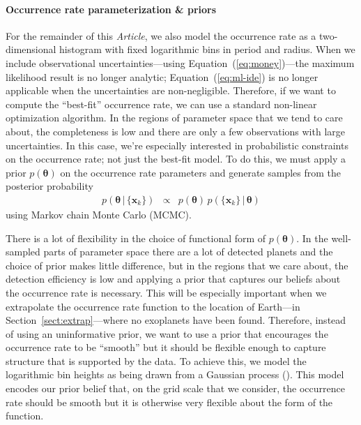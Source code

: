 \documentclass[12pt,preprint]{aastex}
\newcommand{\paper}{\textsl{Article}}
\newcommand{\Eq}[1]{Equation~(\ref{eq:#1})}
\newcommand{\eq}[1]{\Eq{#1}}
\newcommand{\eqlabel}[1]{\label{eq:#1}}
\newcommand{\Sect}[1]{Section~\ref{sect:#1}}
\newcommand{\sect}[1]{\Sect{#1}}
\newcommand{\bvec}[1]{\ensuremath{\boldsymbol{#1}}}
\newcommand{\ratepar}{{\ensuremath{\theta}}}
\newcommand{\ratepars}{{\ensuremath{\bvec{\ratepar}}}}
\newcommand{\data}{{\ensuremath{\bvec{x}}}}
\begin{document}
\paragraph{Occurrence rate parameterization \& priors}
For the remainder of this \paper, we also model the occurrence rate as a
two-dimensional histogram with fixed logarithmic bins in period and radius.
When we include observational uncertainties---using \eq{money}---the maximum
likelihood result is no longer analytic; \eq{ml-ide} is no longer applicable
when the uncertainties are non-negligible.
Therefore, if we want to compute the ``best-fit'' occurrence rate, we can use a
standard non-linear optimization algorithm.
In the regions of parameter space that we tend to care about, the completeness
is low and there are only a few observations with large uncertainties.
In this case, we're especially interested in probabilistic constraints on the
occurrence rate; not just the best-fit model.
To do this, we must apply a prior $p(\ratepars)$ on the occurrence rate
parameters and generate samples from the posterior probability
\begin{eqnarray}\eqlabel{posterior}
p(\ratepars\,|\,\{\data_k\}) &\propto&
    p(\ratepars)\,p(\{\data_k\}\,|\,\ratepars)
\end{eqnarray}
using Markov chain Monte Carlo (MCMC).

There is a lot of flexibility in the choice of functional form of
$p(\ratepars)$.
In the well-sampled parts of parameter space there are a lot of
detected planets and the choice of prior makes little difference, but in the
regions that we care about, the detection efficiency is low and applying a
prior that captures our beliefs about the occurrence rate is necessary.
This will be especially important when we extrapolate the occurrence rate
function to the location of Earth---in \sect{extrap}---where no exoplanets
have been found.
Therefore, instead of using an uninformative prior, we want to use a prior
that encourages the occurrence rate to be ``smooth'' but it should be flexible
enough to capture structure that is supported by the data.
To achieve this, we model the logarithmic bin heights as being drawn from a
Gaussian process (\citealt{gp, gibson-gp, dfm-gp}).
This model encodes our prior belief that, on the grid scale that we consider,
the occurrence rate should be smooth but it is otherwise very flexible about
the form of the function.
\end{document}
